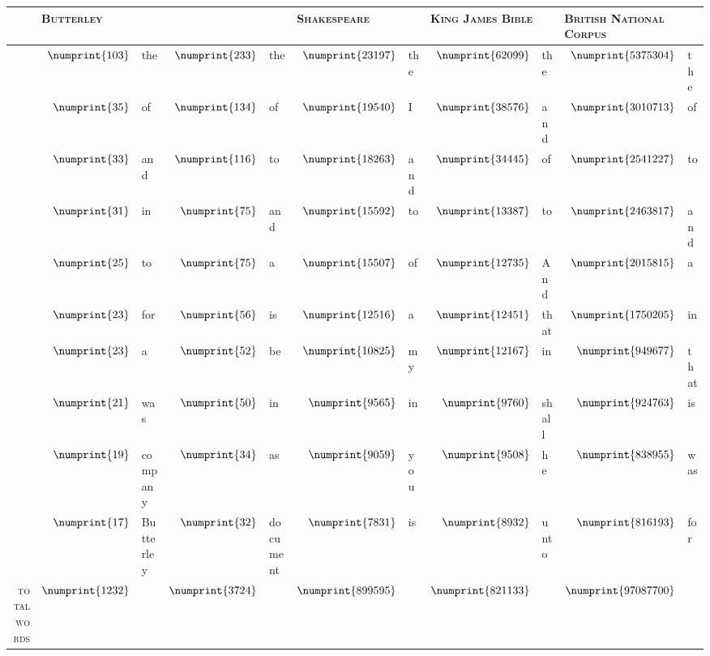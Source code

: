 \begin{table} \footnotesize
    \myfloatalign
  \begin{tabular}{rrlrlrlrlrl} \toprule
    & \multicolumn{2}{l}{\textsc{Butterley}} & \multicolumn{2}{l}{\cite{Pinkney2011}} & \multicolumn{2}{l}{\textsc{Shakespeare}} & \multicolumn{2}{l}{\textsc{King James Bible}} & \multicolumn{2}{l}{\textsc{British National Corpus}}\\ 
    \midrule
		& $\numprint{103}$  & the       & $\numprint{233}$  & the      & $\numprint{23197}$  & the & $\numprint{62099}$  & the   & $\numprint{5375304}$  & the  \\ 
		& $\numprint{35}$   & of        & $\numprint{134}$  & of       & $\numprint{19540}$  & I   & $\numprint{38576}$  & and   & $\numprint{3010713}$  & of   \\ 
		& $\numprint{33}$   & and       & $\numprint{116}$  & to       & $\numprint{18263}$  & and & $\numprint{34445}$  & of    & $\numprint{2541227}$  & to   \\ 
		& $\numprint{31}$   & in        & $\numprint{75}$   & and      & $\numprint{15592}$  & to  & $\numprint{13387}$  & to    & $\numprint{2463817}$  & and  \\ 
		& $\numprint{25}$   & to        & $\numprint{75}$   & a        & $\numprint{15507}$  & of  & $\numprint{12735}$  & And   & $\numprint{2015815}$  & a    \\ 
		& $\numprint{23}$   & for       & $\numprint{56}$   & is       & $\numprint{12516}$  & a   & $\numprint{12451}$  & that  & $\numprint{1750205}$  & in   \\ 
		& $\numprint{23}$   & a         & $\numprint{52}$   & be       & $\numprint{10825}$  & my  & $\numprint{12167}$  & in    & $\numprint{949677}$   & that \\ 
		& $\numprint{21}$   & was       & $\numprint{50}$   & in       & $\numprint{9565}$   & in  & $\numprint{9760}$   & shall & $\numprint{924763}$   & is   \\ 
		& $\numprint{19}$   & company   & $\numprint{34}$   & as       & $\numprint{9059}$   & you & $\numprint{9508}$   & he    & $\numprint{838955}$   & was  \\ 
		& $\numprint{17}$   & Butterley & $\numprint{32}$   & document & $\numprint{7831}$   & is  & $\numprint{8932}$   & unto  & $\numprint{816193}$   & for  \\ 
    \midrule
    \textsc{total words}  & $\numprint{1232}$ & & $\numprint{3724}$ & & $\numprint{899595}$ & & $\numprint{821133}$ & & $\numprint{97087700}$ & \\ 

\end{tabular}
\end{table}
